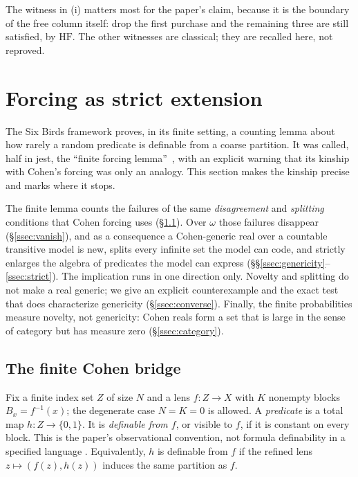 \documentclass[11pt]{article}
\newcommand{\HF}{\mathrm{HF}}                 \newcommand{\rank}{\operatorname{rank}}
\theoremstyle{definition}
\begin{document}
The witness in (i) matters most for the paper's claim, because it is the boundary of the free
column itself: drop the first purchase and the remaining three are still satisfied, by $\HF$. The
other witnesses are classical; they are recalled here, not reproved.
 \section{Forcing as strict extension}\label{sec:forcing}

The Six Birds framework proves, in its finite setting, a counting lemma about how rarely a random
predicate is definable from a coarse partition. It was called, half in jest, the ``finite forcing
lemma''~\citep{SBTFoundationsI}, with an explicit warning that its kinship with Cohen's forcing
\citep{Cohen1963,Cohen1966} was only an analogy. This section makes the kinship precise and marks
where it stops.

The finite lemma counts the failures of the same \emph{disagreement} and \emph{splitting}
conditions that Cohen forcing uses (\S\ref{ssec:finitebridge}). Over $\omega$ those failures
disappear (\S\ref{ssec:vanish}), and as a consequence a Cohen-generic real over a countable
transitive model is new, splits every infinite set the model can code, and strictly enlarges the
algebra of predicates the model can express (\S\S\ref{ssec:genericity}--\ref{ssec:strict}). The
implication runs in one direction only. Novelty and splitting do not make a real generic; we give
an explicit counterexample and the exact test that does characterize genericity
(\S\ref{ssec:converse}). Finally, the finite probabilities measure novelty, not genericity:
Cohen reals form a set that is large in the sense of category but has measure zero
(\S\ref{ssec:category}).

\subsection{The finite Cohen bridge}\label{ssec:finitebridge}

Fix a finite index set $Z$ of size $N$ and a lens $f\colon Z\to X$ with $K$ nonempty blocks
$B_x=f^{-1}(x)$; the degenerate case $N=K=0$ is allowed. A \emph{predicate} is a total map
$h\colon Z\to\{0,1\}$. It is \emph{definable from $f$}, or visible to $f$, if it is constant on
every block. This is the paper's observational convention, not formula definability in a
specified language \citep[for which see][]{Libkin2004}. Equivalently, $h$ is definable from $f$
if the refined lens $z\mapsto(f(z),h(z))$ induces the same partition as $f$.
\end{document}
